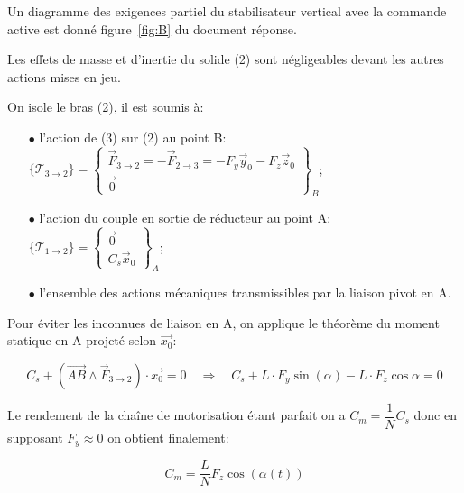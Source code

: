 Un diagramme des exigences partiel du stabilisateur vertical avec la commande active est donné figure~\ref{fig:B} du document réponse.

Les effets de masse et d'inertie du solide (2) sont négligeables devant les autres actions mises en jeu.
\fi




\ifprof
\begin{corrige}
On isole le bras (2), il est soumis à:
\begin{itemize}
\item[$\bullet$] l'action de (3) sur (2) au point B: $\{ \mathcal{T}_{3\to2} \} = \begin{Bmatrix} \overrightarrow{F}_{3\to2} = -\overrightarrow{F}_{2\to3} = -F_y \vec{y}_0 - F_z \vec{z}_0 \\ \overrightarrow{0} \end{Bmatrix}_B$;
\item[$\bullet$] l'action du couple en sortie de réducteur au point A: $\{ \mathcal{T}_{1\to2} \} = \begin{Bmatrix} \overrightarrow{0}  \\ C_s \vec{x}_0 \end{Bmatrix}_A$;
\item[$\bullet$] l'ensemble des actions mécaniques transmissibles par la liaison pivot en A.
\end{itemize}

Pour éviter les inconnues de liaison en A, on applique le théorème du moment statique en A projeté selon $\overrightarrow{x_0}$:

$$ C_s + (\overrightarrow{AB} \wedge \overrightarrow{F}_{3 \to 2})\cdot \overrightarrow{x_0} = 0 \quad \Rightarrow \quad C_s + L\cdot F_y\sin(\alpha) - L\cdot F_z\cos{\alpha} = 0 $$

Le rendement de la chaîne de motorisation étant parfait on a $C_m = \dfrac{1}{N}C_s$ donc en supposant $F_y \approx 0$ on obtient finalement:

$$ \boxed{C_m = \dfrac{L}{N}F_z\cos(\alpha(t))} $$
\end{corrige}
\else
\fi

